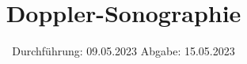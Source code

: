

\subject{US3}
\title{Doppler-Sonographie}
\date{%
  Durchführung: 09.05.2023
  \hspace{3em}
  Abgabe: 15.05.2023
}



\maketitle
\thispagestyle{empty}
\tableofcontents
\newpage







\printbibliography{}





